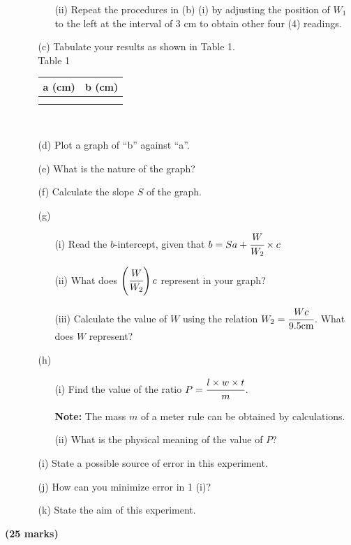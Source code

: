 \begin{enumerate}
\begin{enumerate}
\begin{enumerate}
\item[(ii)] Repeat the procedures in (b) (i) by adjusting the position of $W_1$ to the left at the interval of 3 cm to obtain other four (4) readings.
\end{enumerate}
\item[(c)] Tabulate your results as shown in Table 1.\\

\quad Table 1\\
\quad \quad \begin{tabular}{|p{4cm}|p{4cm}|} \hline
\multicolumn{1}{|c|}{a (cm)} & \multicolumn{1}{c|}{b (cm)} \\ \hline
& \\ \hline
& \\ \hline
\end{tabular}\\[10pt]

\item[(d)] Plot a graph of ``b'' against ``a''.
\item[(e)] What is the nature of the graph?
\item[(f)] Calculate the slope $S$ of the graph.
\item[(g)]
\begin{enumerate}
\item[(i)] Read the $b$-intercept, given that $b = Sa + \cfrac{W}{W_2} \times c$
\item[(ii)] What does $\left(\cfrac{W}{W_2}\right)c$ represent in your graph?
\item[(iii)] Calculate the value of $W$ using the relation $W_2 = \cfrac{Wc}{9.5 \text{cm}}$. What does $W$ represent?
\end{enumerate}
\item[(h)]
\begin{enumerate}
\item[(i)] Find the value of the ratio $P = \cfrac{l \times w \times t}{m}$.
\item[] \textbf{Note:} The mass $m$ of a meter rule can be obtained by calculations.
\item[(ii)] What is the physical meaning of the value of $P$?
\end{enumerate}
\item[(i)] State a possible source of error in this experiment.
\item[(j)] How can you minimize error in 1 (i)?
\item[(k)] State the aim of this experiment.
\end{enumerate}
\end{enumerate}
\flushright \textbf{(25 marks)}
\flushleft

